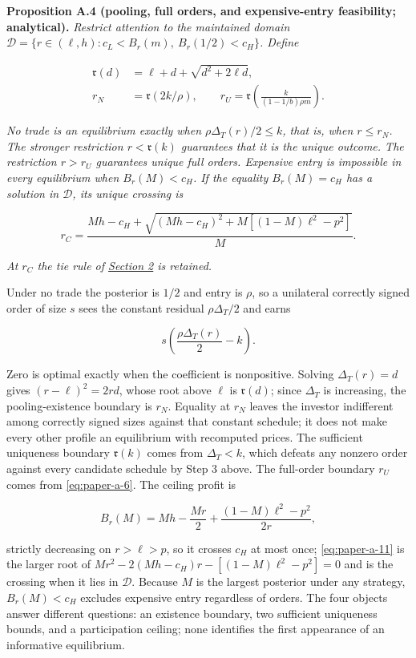 \documentclass[
  12pt,
]{article}
\begin{document}
\protect{}\label{result-proposition-a-4}{\textbf{Proposition
A.4 (pooling, full orders, and expensive-entry feasibility;
analytical).}} \emph{Restrict attention to the maintained domain
\(\mathcal D=\{r\in(\ell,h):c_L<B_r(m),\ B_r(1/2)<c_H\}\). Define}

\[
\begin{aligned}
\mathfrak r(d)&=\ell+d+\sqrt{d^2+2\ell d},\\
r_N&=\mathfrak r(2k/\rho),\qquad
r_U=\mathfrak r\left(\frac{k}{(1-1/b)\rho m}\right).
\end{aligned}
\tag{A.10}\label{eq:paper-a-10}
\]

\emph{No trade is an equilibrium exactly when
\(\rho\Delta_T(r)/2\le k\), that is, when \(r\le r_N\). The stronger
restriction \(r<\mathfrak r(k)\) guarantees that it is the unique
outcome. The restriction \(r>r_U\) guarantees unique full orders.
Expensive entry is impossible in every equilibrium when \(B_r(M)<c_H\).
If the equality \(B_r(M)=c_H\) has a solution in \(\mathcal D\), its
unique crossing is}

\[
r_C=\frac{Mh-c_H+\sqrt{(Mh-c_H)^2+M[(1-M)\ell^2-p^2]}}{M}.
\tag{A.11}\label{eq:paper-a-11}
\]

\emph{At \(r_C\) the tie rule of \hyperref[sec-model]{Section 2} is
retained.}

Under no trade the posterior is \(1/2\) and entry is \(\rho\), so a
unilateral correctly signed order of size \(s\) sees the constant
residual \(\rho\Delta_T/2\) and earns

\[
s\left(\frac{\rho\Delta_T(r)}{2}-k\right).
\tag{A.12}\label{eq:paper-a-12}
\]

Zero is optimal exactly when the coefficient is nonpositive. Solving
\(\Delta_T(r)=d\) gives \((r-\ell)^2=2rd\), whose root above \(\ell\) is
\(\mathfrak r(d)\); since \(\Delta_T\) is increasing, the
pooling-existence boundary is \(r_N\). Equality at \(r_N\) leaves the
investor indifferent among correctly signed sizes against that constant
schedule; it does not make every other profile an equilibrium with
recomputed prices. The sufficient uniqueness boundary \(\mathfrak r(k)\)
comes from \(\Delta_T<k\), which defeats any nonzero order against every
candidate schedule by Step 3 above. The full-order boundary \(r_U\)
comes from \eqref{eq:paper-a-6}. The ceiling profit is

\[
B_r(M)=Mh-\frac{Mr}{2}+\frac{(1-M)\ell^2-p^2}{2r},
\tag{A.13}\label{eq:paper-a-13}
\]

strictly decreasing on \(r>\ell>p\), so it crosses \(c_H\) at most once;
\eqref{eq:paper-a-11} is the larger root of
\(Mr^2-2(Mh-c_H)r-[(1-M)\ell^2-p^2]=0\) and is the crossing when it lies
in \(\mathcal D\). Because \(M\) is the largest posterior under any
strategy, \(B_r(M)<c_H\) excludes expensive entry regardless of orders.
The four objects answer different questions: an existence boundary, two
sufficient uniqueness bounds, and a participation ceiling; none
identifies the first appearance of an informative equilibrium.
\end{document}
